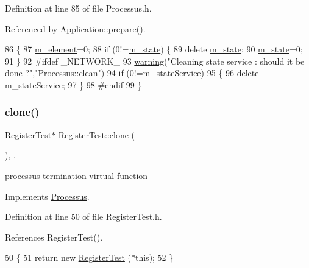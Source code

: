Definition at line 85 of file Processus.\+h.



Referenced by Application\+::prepare().


\begin{DoxyCode}
86   \{
87     \hyperlink{classProcessus_aa9d24d53c3e52f36786cabb5d8e296e7}{m\_element}=0;
88     \textcolor{keywordflow}{if} (0!=\hyperlink{classProcessus_ab3539eee42891ceae0baf4395ae7fb61}{m\_state}) \{
89       \textcolor{keyword}{delete} \hyperlink{classProcessus_ab3539eee42891ceae0baf4395ae7fb61}{m\_state};
90       \hyperlink{classProcessus_ab3539eee42891ceae0baf4395ae7fb61}{m\_state}=0;
91     \}
92 \textcolor{preprocessor}{#ifdef \_NETWORK\_
}
93     \hyperlink{classObject_a65cd4fda577711660821fd2cd5a3b4c9}{warning}(\textcolor{stringliteral}{"Cleaning state service : should it be done ?"},\textcolor{stringliteral}{"Processus::clean"})
94       if (0!=m\_stateService)
95       \{
96         \textcolor{keyword}{delete} m\_stateService;
97       \}
98 \textcolor{preprocessor}{#endif
}
99   \}
\end{DoxyCode}
\mbox{\label{classRegisterTest_a05c7318198562df874c8d7ab5d0e9f89}} 
\subsubsection{\texorpdfstring{clone()}{clone()}}
{\footnotesize\ttfamily \hyperlink{classRegisterTest}{Register\+Test}$\ast$ Register\+Test\+::clone (\begin{DoxyParamCaption}{ }\end{DoxyParamCaption})\hspace{0.3cm}{\ttfamily [inline]}, {\ttfamily [protected]}, {\ttfamily [virtual]}}

processus termination virtual function 

Implements \hyperlink{classProcessus_aca8856f6d6d7b7e1fe941f298dcbb502}{Processus}.



Definition at line 50 of file Register\+Test.\+h.



References Register\+Test().


\begin{DoxyCode}
50                        \{
51     \textcolor{keywordflow}{return} \textcolor{keyword}{new} \hyperlink{classRegisterTest_a0c77058c104d6249d884d864a4f61524}{RegisterTest} (*\textcolor{keyword}{this});
52   \}
\end{DoxyCode}
\mbox{\label{classProcessus_a2f3c41e99da4c738ea3d8f7b0d20a665}} 
